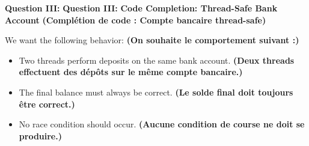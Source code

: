 \documentclass[11pt,a4paper]{article}
\begin{document}
	
	\noindent\makebox[\linewidth]{\dotfill}\par\vspace{6pt}
	\vspace{0.5cm}
	\noindent\makebox[\linewidth]{\dotfill}\par\vspace{6pt}
	\vspace{0.5cm}
	\noindent\makebox[\linewidth]{\dotfill}\par\vspace{6pt}
	\vspace{0.5cm}
	\noindent\makebox[\linewidth]{\dotfill}\par\vspace{6pt}
	\vspace{0.5cm}
	\noindent\makebox[\linewidth]{\dotfill}\par\vspace{6pt}
	\vspace{0.5cm}
	\noindent\makebox[\linewidth]{\dotfill}\par\vspace{6pt}
	\vspace{0.5cm}
	\noindent\makebox[\linewidth]{\dotfill}\par\vspace{6pt}
	\vspace{0.5cm}
	\noindent\makebox[\linewidth]{\dotfill}\par
	\vspace{0.5cm}
	
	\textbf{Question III:}  
\textbf{Question III:}  
\textbf{Code Completion: Thread-Safe Bank Account}
\textbf{(Complétion de code : Compte bancaire thread-safe)}

We want the following behavior:
\textbf{(On souhaite le comportement suivant :)}

\begin{itemize}
	\item Two threads perform deposits on the same bank account.
	\textbf{(Deux threads effectuent des dépôts sur le même compte bancaire.)}
	
	\item The final balance must always be correct.
	\textbf{(Le solde final doit toujours être correct.)}
	
	\item No race condition should occur.
	\textbf{(Aucune condition de course ne doit se produire.)}
\end{itemize}
\end{document}
